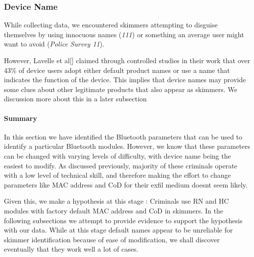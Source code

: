 \begin{table}[]
\centering
\scriptsize
{}
\caption{Distribution of Uncategorized RN and HC modules observed per state}
\label{tab:Modules_state}
\end{table}

\subsubsection{Device Name}
While collecting data, we encountered skimmers attempting to disguise themselves by using innocuous names (\textit{111}) or something an average user might want to avoid (\textit{Police Survey 11}). 

However, Lavelle et al[\cite{bluetoothnames}] claimed through controlled studies in their work that over 43\% of device users adopt either default product names or use a name that indicates the function of the device. This implies that device names may provide some clues about other legitimate products that also appear as skimmers. We discussion more about this in a later subsection

\paragraph{Summary}
In this section we have identified the Bluetooth parameters that can be used to identify a particular Bluetooth modules. However, we know that these parameters can be changed with varying levels of difficulty, with device name being the easiest to modify. As discussed previously, majority of these criminals operate with a low level of technical skill, and therefore making the effort to change parameters like MAC address and CoD for their exfil medium doesnt seem likely. 

Given this, we make a hypothesis at this stage : Criminals use RN and HC modules with factory default MAC address and CoD in skimmers. In the following subsections we attempt to provide evidence to support the hypothesis with our data. While at this stage default names appear to be unreliable for skimmer identification because of ease of modification, we shall discover eventually that they work well a lot of cases.


